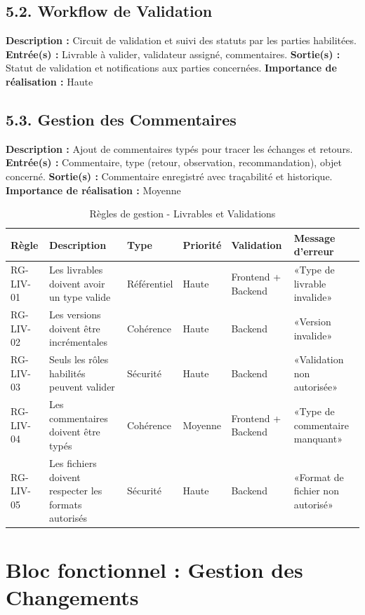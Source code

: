 \subsection{5.2. Workflow de Validation}
\textbf{Description :} Circuit de validation et suivi des statuts par les parties habilitées.
\textbf{Entrée(s) :} Livrable à valider, validateur assigné, commentaires.
\textbf{Sortie(s) :} Statut de validation et notifications aux parties concernées.
\textbf{Importance de réalisation :} Haute

\subsection{5.3. Gestion des Commentaires}
\textbf{Description :} Ajout de commentaires typés pour tracer les échanges et retours.
\textbf{Entrée(s) :} Commentaire, type (retour, observation, recommandation), objet concerné.
\textbf{Sortie(s) :} Commentaire enregistré avec traçabilité et historique.
\textbf{Importance de réalisation :} Moyenne

\begin{table}[H]
\centering
\footnotesize
\begin{tabular}{|p{1.5cm}|p{3.5cm}|p{1.5cm}|p{1.5cm}|p{2cm}|p{2.5cm}|}
\hline
\textbf{Règle} & \textbf{Description} & \textbf{Type} & \textbf{Priorité} & \textbf{Validation} & \textbf{Message d'erreur} \\
\hline
RG-LIV-01 & Les livrables doivent avoir un type valide & Référentiel & Haute & Frontend + Backend & «Type de livrable invalide» \\
\hline
RG-LIV-02 & Les versions doivent être incrémentales & Cohérence & Haute & Backend & «Version invalide» \\
\hline
RG-LIV-03 & Seuls les rôles habilités peuvent valider & Sécurité & Haute & Backend & «Validation non autorisée» \\
\hline
RG-LIV-04 & Les commentaires doivent être typés & Cohérence & Moyenne & Frontend + Backend & «Type de commentaire manquant» \\
\hline
RG-LIV-05 & Les fichiers doivent respecter les formats autorisés & Sécurité & Haute & Backend & «Format de fichier non autorisé» \\
\hline
\end{tabular}
\caption{Règles de gestion - Livrables et Validations}
\label{tab:rg_livrables}
\end{table}

\section{Bloc fonctionnel : Gestion des Changements}

